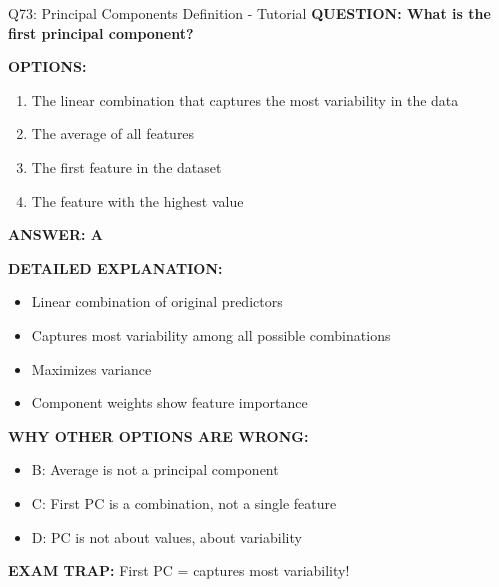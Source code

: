 \documentclass[8pt]{beamer}
\begin{document}
	\begin{frame}{Q73: Principal Components Definition - Tutorial}
		\fontsize{6.5}{7.5}\selectfont
		\textbf{QUESTION: What is the first principal component?}
		
		\vspace{0.1cm}
		\textbf{OPTIONS:}
		\begin{enumerate}
			\item The linear combination that captures the most variability in the data
			\item The average of all features
			\item The first feature in the dataset
			\item The feature with the highest value
		\end{enumerate}
		
		\vspace{0.1cm}
		\textcolor{myblue}{\textbf{ANSWER: A}}
		
		\vspace{0.1cm}
		\textbf{DETAILED EXPLANATION:}
		\begin{itemize}
			\item Linear combination of original predictors
			\item Captures most variability among all possible combinations
			\item Maximizes variance
			\item Component weights show feature importance
		\end{itemize}
		
		\vspace{0.1cm}
		\textcolor{myred}{\textbf{WHY OTHER OPTIONS ARE WRONG:}}
		\begin{itemize}
			\item \textcolor{myred}{B:} Average is not a principal component
			\item \textcolor{myred}{C:} First PC is a combination, not a single feature
			\item \textcolor{myred}{D:} PC is not about values, about variability
		\end{itemize}
		
		\textcolor{myred}{\textbf{EXAM TRAP:}} First PC = \textcolor{myblue}{captures most variability}!
	\end{frame}
	
\end{document}
